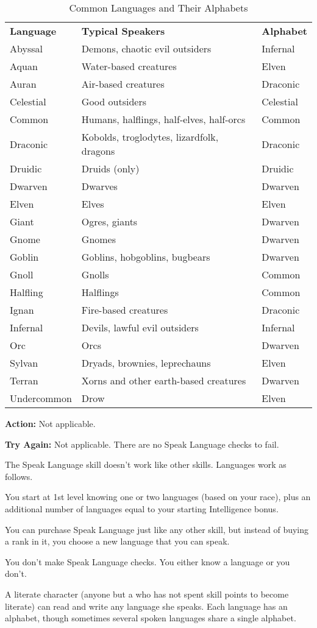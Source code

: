 
\begin{table}[htb]
\caption{Common Languages and Their Alphabets}
\centering
\begin{tabular}{l l l}
\textbf{Language} & \textbf{Typical Speakers} & \textbf{Alphabet}\\
Abyssal & Demons, chaotic evil outsiders & Infernal\\
Aquan & Water-based creatures & Elven\\
Auran & Air-based creatures & Draconic\\
Celestial & Good outsiders & Celestial\\
Common & Humans, halflings, half-elves, half-orcs & Common\\
Draconic & Kobolds, troglodytes, lizardfolk, dragons & Draconic\\
Druidic & Druids (only) & Druidic\\
Dwarven & Dwarves & Dwarven\\
Elven & Elves & Elven\\
Giant & Ogres, giants & Dwarven\\
Gnome & Gnomes & Dwarven\\
Goblin & Goblins, hobgoblins, bugbears & Dwarven\\
Gnoll & Gnolls & Common\\
Halfling & Halflings & Common\\
Ignan & Fire-based creatures & Draconic\\
Infernal & Devils, lawful evil outsiders & Infernal\\
Orc & Orcs & Dwarven\\
Sylvan & Dryads, brownies, leprechauns & Elven\\
Terran & Xorns and other earth-based creatures & Dwarven\\
Undercommon & Drow & Elven\\
\end{tabular}
\end{table}

\textbf{Action:} Not applicable.

\textbf{Try Again:} Not applicable. There are no Speak Language checks to fail.

The Speak Language skill doesn't work like other skills. Languages work as follows.

\begin{itemize*}
\item You start at 1st level knowing one or two languages (based on your race), plus 
an additional number of languages equal to your starting Intelligence bonus.
\item You can purchase Speak Language just like any other skill, but instead of buying 
a rank in it, you choose a new language that you can speak.
\item You don't make Speak Language checks. You either know a language or you don't.
\end{itemize*}

A literate character (anyone but a  who has not spent skill points to 
become literate) can read and write any language she speaks. Each language has 
an alphabet, though sometimes several spoken languages share a single alphabet.

